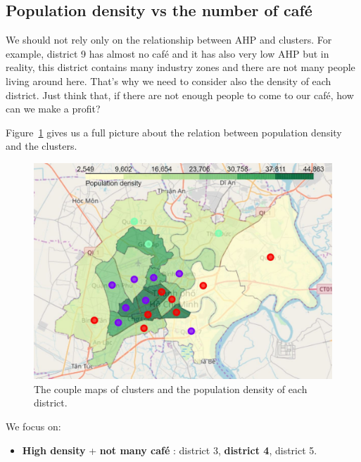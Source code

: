 \documentclass[12pt,a4paper]{article}
\begin{document}
\subsection{Population density vs the number of café}

We should not rely only on the relationship between AHP and clusters. For example, district 9 has almost no café and it has also very low AHP but in reality, this district contains many industry zones and there are not many people living around here. That's why we need to consider also the density of each district. Just think that, if there are not enough people to come to our café, how can we make a profit?

Figure~\ref{fig:ahp_density} gives us a full picture about the relation between population density and the clusters.

 \begin{center}
    \begin{figure}[htp]
    \begin{center}
     \includegraphics[width=\textwidth]{fig/ahp_density}
    \end{center}
    \caption{The couple maps of clusters and the population density of each district.}
    \label{fig:ahp_density}
    \end{figure}
\end{center}

We focus on:

\begin{itemize}
\item \textbf{High density} + \textbf{not many café} : district 3, \textbf{district 4}, district 5.
\end{itemize}
\end{document}
